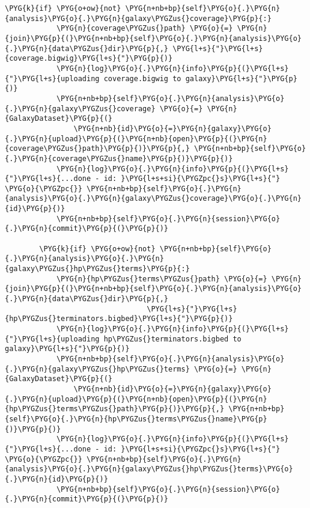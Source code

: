 \begin{Verbatim}[commandchars=\\\{\}]
        \PYG{k}{if} \PYG{o+ow}{not} \PYG{n+nb+bp}{self}\PYG{o}{.}\PYG{n}{analysis}\PYG{o}{.}\PYG{n}{galaxy\PYGZus{}coverage}\PYG{p}{:}
            \PYG{n}{coverage\PYGZus{}path} \PYG{o}{=} \PYG{n}{join}\PYG{p}{(}\PYG{n+nb+bp}{self}\PYG{o}{.}\PYG{n}{analysis}\PYG{o}{.}\PYG{n}{data\PYGZus{}dir}\PYG{p}{,} \PYG{l+s}{"}\PYG{l+s}{coverage.bigwig}\PYG{l+s}{"}\PYG{p}{)}
            \PYG{n}{log}\PYG{o}{.}\PYG{n}{info}\PYG{p}{(}\PYG{l+s}{"}\PYG{l+s}{uploading coverage.bigwig to galaxy}\PYG{l+s}{"}\PYG{p}{)}
            \PYG{n+nb+bp}{self}\PYG{o}{.}\PYG{n}{analysis}\PYG{o}{.}\PYG{n}{galaxy\PYGZus{}coverage} \PYG{o}{=} \PYG{n}{GalaxyDataset}\PYG{p}{(}
                \PYG{n+nb}{id}\PYG{o}{=}\PYG{n}{galaxy}\PYG{o}{.}\PYG{n}{upload}\PYG{p}{(}\PYG{n+nb}{open}\PYG{p}{(}\PYG{n}{coverage\PYGZus{}path}\PYG{p}{)}\PYG{p}{,} \PYG{n+nb+bp}{self}\PYG{o}{.}\PYG{n}{coverage\PYGZus{}name}\PYG{p}{)}\PYG{p}{)}
            \PYG{n}{log}\PYG{o}{.}\PYG{n}{info}\PYG{p}{(}\PYG{l+s}{"}\PYG{l+s}{...done - id: }\PYG{l+s+si}{\PYGZpc{}s}\PYG{l+s}{"} \PYG{o}{\PYGZpc{}} \PYG{n+nb+bp}{self}\PYG{o}{.}\PYG{n}{analysis}\PYG{o}{.}\PYG{n}{galaxy\PYGZus{}coverage}\PYG{o}{.}\PYG{n}{id}\PYG{p}{)}
            \PYG{n+nb+bp}{self}\PYG{o}{.}\PYG{n}{session}\PYG{o}{.}\PYG{n}{commit}\PYG{p}{(}\PYG{p}{)}

        \PYG{k}{if} \PYG{o+ow}{not} \PYG{n+nb+bp}{self}\PYG{o}{.}\PYG{n}{analysis}\PYG{o}{.}\PYG{n}{galaxy\PYGZus{}hp\PYGZus{}terms}\PYG{p}{:}
            \PYG{n}{hp\PYGZus{}terms\PYGZus{}path} \PYG{o}{=} \PYG{n}{join}\PYG{p}{(}\PYG{n+nb+bp}{self}\PYG{o}{.}\PYG{n}{analysis}\PYG{o}{.}\PYG{n}{data\PYGZus{}dir}\PYG{p}{,}
                                 \PYG{l+s}{"}\PYG{l+s}{hp\PYGZus{}terminators.bigbed}\PYG{l+s}{"}\PYG{p}{)}
            \PYG{n}{log}\PYG{o}{.}\PYG{n}{info}\PYG{p}{(}\PYG{l+s}{"}\PYG{l+s}{uploading hp\PYGZus{}terminators.bigbed to galaxy}\PYG{l+s}{"}\PYG{p}{)}
            \PYG{n+nb+bp}{self}\PYG{o}{.}\PYG{n}{analysis}\PYG{o}{.}\PYG{n}{galaxy\PYGZus{}hp\PYGZus{}terms} \PYG{o}{=} \PYG{n}{GalaxyDataset}\PYG{p}{(}
                \PYG{n+nb}{id}\PYG{o}{=}\PYG{n}{galaxy}\PYG{o}{.}\PYG{n}{upload}\PYG{p}{(}\PYG{n+nb}{open}\PYG{p}{(}\PYG{n}{hp\PYGZus{}terms\PYGZus{}path}\PYG{p}{)}\PYG{p}{,} \PYG{n+nb+bp}{self}\PYG{o}{.}\PYG{n}{hp\PYGZus{}terms\PYGZus{}name}\PYG{p}{)}\PYG{p}{)}
            \PYG{n}{log}\PYG{o}{.}\PYG{n}{info}\PYG{p}{(}\PYG{l+s}{"}\PYG{l+s}{...done - id: }\PYG{l+s+si}{\PYGZpc{}s}\PYG{l+s}{"} \PYG{o}{\PYGZpc{}} \PYG{n+nb+bp}{self}\PYG{o}{.}\PYG{n}{analysis}\PYG{o}{.}\PYG{n}{galaxy\PYGZus{}hp\PYGZus{}terms}\PYG{o}{.}\PYG{n}{id}\PYG{p}{)}
            \PYG{n+nb+bp}{self}\PYG{o}{.}\PYG{n}{session}\PYG{o}{.}\PYG{n}{commit}\PYG{p}{(}\PYG{p}{)}


\end{Verbatim}
